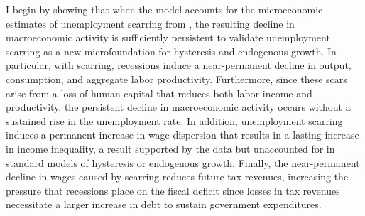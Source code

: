 I begin by showing that when the model accounts for the microeconomic estimates of unemployment scarring from \cite{DavisVonWachter2011}, the resulting decline in macroeconomic activity is sufficiently persistent to validate unemployment scarring as a new microfoundation for hysteresis and endogenous growth. In particular, with scarring, recessions induce a near-permanent decline in output, consumption, and aggregate labor productivity. Furthermore, since these scars arise from a loss of human capital that reduces both labor income and productivity, the persistent decline in macroeconomic activity occurs without a sustained rise in the unemployment rate. In addition, unemployment scarring induces a permanent increase in wage dispersion that results in a lasting increase in income inequality, a result supported by the data but unaccounted for in standard models of hysteresis or endogenous growth. Finally, the near-permanent decline in wages caused by scarring reduces future tax revenues, increasing the pressure that recessions place on the fiscal deficit since losses in tax revenues necessitate a larger increase in debt to sustain government expenditures. 


